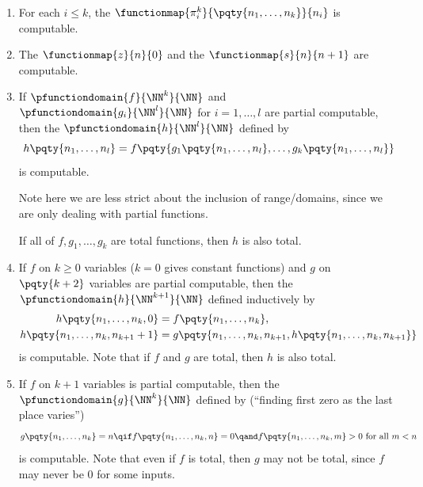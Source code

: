 \begin{theorem}
    \label{thm:partial-computable-closure-properties}%
    \begin{enumerate}[label=(\alph*)]
        \item For each \(i \leq k\), the  \(\functionmap{\pi_i^k}{\pqty{n_1, \ldots, n_k}}{n_i}\) is computable.
        \item The  \(\functionmap{z}{n}{0}\) and the  \(\functionmap{s}{n}{n + 1}\) are computable.
        \item If \(\pfunctiondomain{f}{\NN^k}{\NN}\) and \(\pfunctiondomain{g_i}{\NN^l}{\NN}\) for \(i = 1, \ldots, l\) are partial computable, then the  \(\pfunctiondomain{h}{\NN^l}{\NN}\) defined by
        \[
            h\pqty{n_1, \ldots, n_l} = f\pqty{g_1\pqty{n_1, \ldots, n_l}, \ldots, g_k\pqty{n_1, \ldots, n_l}}
        \]
        is computable.

        Note here we are less strict about the inclusion of range/domains, since we are only dealing with partial functions.

        If all of \(f, g_1, \ldots, g_k\) are total functions, then \(h\) is also total.
        \item If \(f\) on \(k \geq 0\) variables (\(k = 0\) gives constant functions) and \(g\) on \(\pqty{k + 2}\) variables are partial computable, then the  \(\pfunctiondomain{h}{\NN^{k + 1}}{\NN}\) defined inductively by
        \begin{align*}
            h\pqty{n_1, \ldots, n_k, 0} &= f\pqty{n_1, \ldots, n_k}, \\
            h\pqty{n_1, \ldots, n_k, n_{k + 1} + 1} &= g\pqty{n_1, \ldots, n_k, n_{k + 1}, h\pqty{n_1, \ldots, n_k, n_{k + 1}}}
        \end{align*}
        is computable. Note that if \(f\) and \(g\) are total, then \(h\) is also total.
        \item If \(f\) on \(k + 1\) variables is partial computable, then the  \(\pfunctiondomain{g}{\NN^k}{\NN}\) defined by (``finding first zero as the last place varies'')
        \[
            g\pqty{n_1, \ldots, n_k} = n \qif f\pqty{n_1, \ldots, n_k, n} = 0 \qand f\pqty{n_1, \ldots, n_k, m} > 0 \text{ for all } m < n
        \]
        is computable. Note that even if \(f\) is total, then \(g\) may not be total, since \(f\) may never be \(0\) for some inputs.
    \end{enumerate}
\end{theorem}

